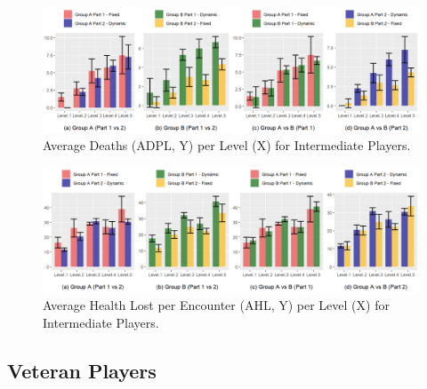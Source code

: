 \begin{figure}[!ht]
    \caption{Average Deaths (ADPL, Y) per Level (X) for Intermediate Players.}
    \begin{center}
        \includegraphics[width=34em]{figures/deaths_per_level-intermediate_players.png}
    \end{center}
    \label{fig:result-metric-intermediates-deaths-per-level}
\end{figure}

\begin{figure}[!ht]
    \caption{Average Health Lost per Encounter (AHL, Y) per Level (X) for Intermediate Players.}
    \begin{center}
        \includegraphics[width=34em]{figures/health_lost_per_encounter-intermediate_players.png}
    \end{center}
    \label{fig:result-metric-intermediates-health-lost-per-encounter}
\end{figure}


\subsection{Veteran Players}


